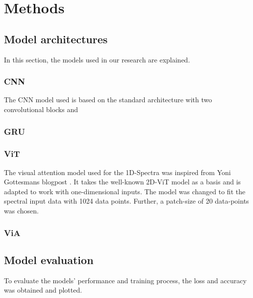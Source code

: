 


\chapter{Methods} %

\label{Chapter3} %







\section{Model architectures}
In this section, the models used in our research are explained.

\subsection{CNN}
The CNN model used is based on the standard architecture with two convolutional blocks and 


\subsection{GRU}


\subsection{ViT}
The visual attention model used for the 1D-Spectra was inspired from Yoni Gottesmans blogpost \cite{noauthor_interpretable_2023}. It takes the well-known 2D-ViT model as a basis and is adapted to work with one-dimensional inputs.
The model was changed to fit the spectral input data with 1024 data points. Further, a patch-size of 20 data-points was chosen.



\subsection{ViA}




\section{Model evaluation}

To evaluate the models' performance and training process, the loss and accuracy was obtained and plotted. 